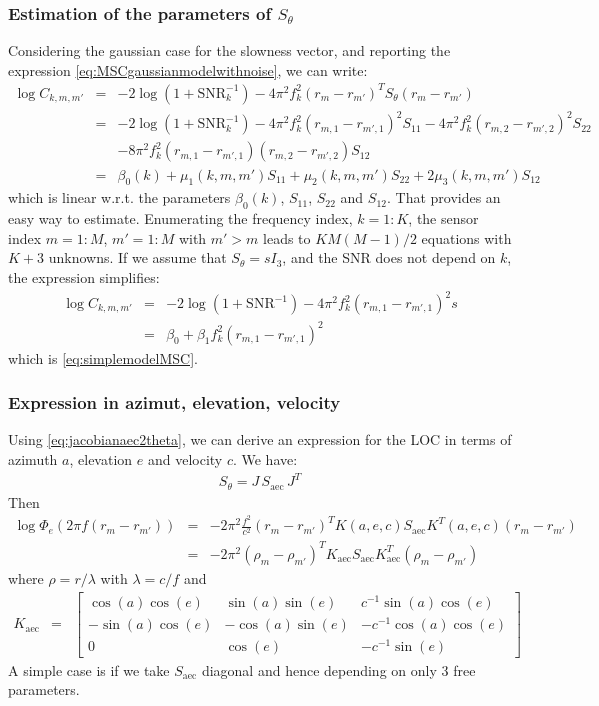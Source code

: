 \documentclass[a4paper, 12pt]{report}
\def\SNR{\mathrm{SNR}}
\def\aec{\mathrm{aec}}
\begin{document}
\subsubsection{Estimation of the parameters of $S_{\theta}$}
Considering the gaussian case for the slowness vector, and reporting the expression \eqref{eq:MSCgaussianmodelwithnoise}, we can write: 
\begin{eqnarray*}
 \log C_{k,m,m'} &=&
-2\log(1+\SNR_k^{-1})
-4\pi^{2} f_{k}^{2}(r_{m}-r_{m'})^{T}S_{\theta}(r_{m}-r_{m'})
 \\
 &=&
-2\log(1+\SNR_k^{-1})
-4\pi^{2} f_{k}^{2}(r_{m,1}-r_{m',1})^{2}S_{11}
-4\pi^{2} f_{k}^{2}(r_{m,2}-r_{m',2})^{2}S_{22}
\\&&
-8\pi^{2} f_{k}^{2}(r_{m,1}-r_{m',1})(r_{m,2}-r_{m',2})S_{12}
\\
&=&
\beta_{0}(k)
+\mu_{1}(k,m,m')S_{11}
+\mu_{2}(k,m,m')S_{22}
+2\mu_{3}(k,m,m')S_{12}
\end{eqnarray*}
which is linear w.r.t. the parameters $\beta_{0}(k)$, $S_{11}$, $S_{22}$ and $S_{12}$. That provides an easy way to estimate.
Enumerating the frequency index, $k=1:K$, the sensor index $m=1:M$, $m'=1:M$ with $m'>m$ leads to $KM(M-1)/2$ equations with $K+3$ unknowns.
If we assume that $S_{\theta}=sI_3$, and the SNR does not depend on $k$, the expression simplifies:
\begin{eqnarray*}
 \log C_{k,m,m'} &=&
-2\log(1+\SNR^{-1})
-4\pi^{2} f_{k}^{2}(r_{m,1}-r_{m',1})^{2}s
\\
&=&\beta_{0}+\beta_{1}f_{k}^{2}(r_{m,1}-r_{m',1})^{2}
\end{eqnarray*}
which is \eqref{eq:simplemodelMSC}.
\subsubsection{Expression in azimut, elevation, velocity}
Using \eqref{eq:jacobianaec2theta}, we can derive an expression for the LOC in terms of azimuth $a$, elevation $e$ and velocity $c$. We have:
\begin{eqnarray}
\label{eq:theta2aec}
S_{\theta}=J\,S_{\aec}\,J^{T}
\end{eqnarray}
Then
\begin{eqnarray*}
 \log \Phi_{e}(2\pi f(r_{m}-r_{m'}))&=& 
-2\pi^2\frac{f^2}{c^2} (r_{m}-r_{m'})^TK(a,e,c)S_{\aec}K^T(a,e,c)(r_{m}-r_{m'})
\\
&=&
-2\pi^2(\rho_{m}-\rho_{m'})^TK_{\aec}S_{\aec}K^T_{\aec}(\rho_{m}-\rho_{m'})
\end{eqnarray*}
where $\rho=r/\lambda$ with $\lambda=c/f$ and
\begin{eqnarray*}
K_{\aec}&=&
\begin{bmatrix}
\cos(a)\cos(e)&\sin(a)\sin(e)&c^{-1}\sin(a)\cos(e)
\\
-\sin(a)\cos(e)&-\cos(a)\sin(e)&-c^{-1}\cos(a)\cos(e)
\\
0&\cos(e)&-c^{-1}\sin(e)
\end{bmatrix}
\end{eqnarray*}
A simple case is if we take $S_{\aec}$ diagonal and hence depending on only 3 free parameters. 
\end{document}
